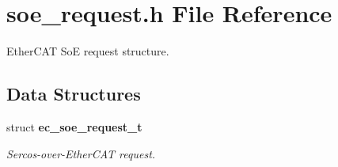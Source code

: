 \section{soe\-\_\-request.\-h \-File \-Reference}
\label{soe__request_8h}


\-Ether\-C\-A\-T \-So\-E request structure.  


\subsection*{\-Data \-Structures}
\begin{DoxyCompactItemize}
\item 
struct {\bf ec\-\_\-soe\-\_\-request\-\_\-t}
\begin{DoxyCompactList}\small\item\em \-Sercos-\/over-\/\-Ether\-C\-A\-T request. \end{DoxyCompactList}\end{DoxyCompactItemize}
